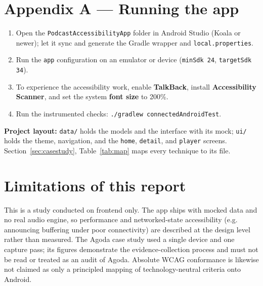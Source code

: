 \section{Appendix A --- Running the app}

\begin{enumerate}[leftmargin=1.4em]
	\item Open the \texttt{PodcastAccessibilityApp} folder in Android Studio (Koala or newer); let it
	      sync and generate the Gradle wrapper and \texttt{local.properties}.
	\item Run the \texttt{app} configuration on an emulator or device (\texttt{minSdk 24},
	      \texttt{targetSdk 34}).
	\item To experience the accessibility work, enable \textbf{TalkBack}, install
	      \textbf{Accessibility Scanner}, and set the system \textbf{font size} to 200\%.
	\item Run the instrumented checks: \texttt{./gradlew connectedAndroidTest}.
\end{enumerate}

\textbf{Project layout:} \texttt{data/} holds the models and the  interface
with its mock; \texttt{ui/} holds the theme, navigation, and the \texttt{home}, \texttt{detail}, and
\texttt{player} screens. Section~\ref{sec:casestudy}, Table~\ref{tab:map} maps every technique to its
file.

\section*{Limitations of this report}

This is a study conducted on frontend only. The app ships with mocked data and no real audio engine, so performance
and networked-state accessibility (e.g. announcing buffering under poor connectivity) are described
at the design level rather than measured. The Agoda case study used a single device and one capture
pass; its figures demonstrate the evidence-collection process and must not be read or treated as an audit
of Agoda. Absolute WCAG conformance is likewise not claimed as only a principled mapping of
technology-neutral criteria onto Android.
